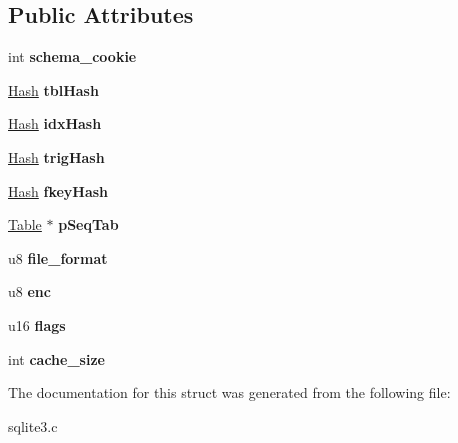 \subsection*{Public Attributes}
\begin{DoxyCompactItemize}
\item 
\hypertarget{struct_schema_a3eef54a64f4f962d64577646bd34a47c}{int {\bfseries schema\-\_\-cookie}}\label{struct_schema_a3eef54a64f4f962d64577646bd34a47c}

\item 
\hypertarget{struct_schema_af841eadc93b289944b95f72b784bfaae}{\hyperlink{struct_hash}{Hash} {\bfseries tbl\-Hash}}\label{struct_schema_af841eadc93b289944b95f72b784bfaae}

\item 
\hypertarget{struct_schema_ac0dd242f486d17ddadca1e47af76c6c5}{\hyperlink{struct_hash}{Hash} {\bfseries idx\-Hash}}\label{struct_schema_ac0dd242f486d17ddadca1e47af76c6c5}

\item 
\hypertarget{struct_schema_ab521f4545d200329d8e1a46bbb67e7c5}{\hyperlink{struct_hash}{Hash} {\bfseries trig\-Hash}}\label{struct_schema_ab521f4545d200329d8e1a46bbb67e7c5}

\item 
\hypertarget{struct_schema_ad51ed96351701cfe8d9e871722827c11}{\hyperlink{struct_hash}{Hash} {\bfseries fkey\-Hash}}\label{struct_schema_ad51ed96351701cfe8d9e871722827c11}

\item 
\hypertarget{struct_schema_ad580e4e662724bee95571d297f94da37}{\hyperlink{struct_table}{Table} $\ast$ {\bfseries p\-Seq\-Tab}}\label{struct_schema_ad580e4e662724bee95571d297f94da37}

\item 
\hypertarget{struct_schema_ab9f0371436e41b3080772995407a4cca}{u8 {\bfseries file\-\_\-format}}\label{struct_schema_ab9f0371436e41b3080772995407a4cca}

\item 
\hypertarget{struct_schema_a1338d09fe9cbb5a8162929202cb73cae}{u8 {\bfseries enc}}\label{struct_schema_a1338d09fe9cbb5a8162929202cb73cae}

\item 
\hypertarget{struct_schema_a14838766a0a438e590a27f300beff459}{u16 {\bfseries flags}}\label{struct_schema_a14838766a0a438e590a27f300beff459}

\item 
\hypertarget{struct_schema_a0a66691be95a30c099ca4840da7110dd}{int {\bfseries cache\-\_\-size}}\label{struct_schema_a0a66691be95a30c099ca4840da7110dd}

\end{DoxyCompactItemize}


The documentation for this struct was generated from the following file\-:\begin{DoxyCompactItemize}
\item 
sqlite3.\-c\end{DoxyCompactItemize}

